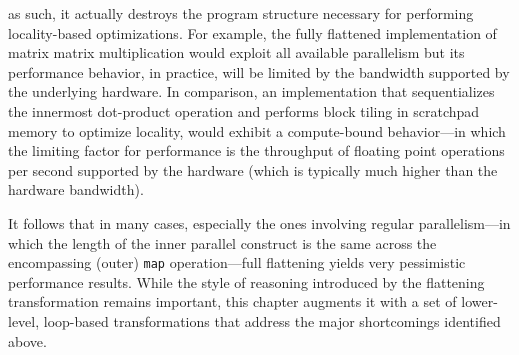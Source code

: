 \documentclass[acmsmall,review]{acmart}\settopmatter{printfolios=true,printccs=false,printacmref=false}
\begin{document}
\begin{itemize}
\begin{itemize}
                as such, it actually destroys the program structure necessary
                for performing locality-based optimizations.
                For example, the fully flattened implementation of matrix
                matrix multiplication would exploit all available parallelism
                but its performance behavior, in practice, will be limited
                by the bandwidth supported by the underlying hardware.
                In comparison, an implementation that sequentializes the 
                innermost dot-product operation and performs block tiling 
                in scratchpad memory to optimize locality, would exhibit 
                a compute-bound behavior---in which the limiting factor 
                for performance is the throughput of floating point 
                operations per second supported by the hardware
                (which is typically much higher than the hardware bandwidth).
        \end{itemize}
\end{itemize}
It follows that in many cases, especially the ones involving regular 
parallelism---in which the length of the inner parallel construct is 
the same across the encompassing (outer) \lstinline{map} operation---full
flattening yields very pessimistic performance results.   While 
the style of reasoning introduced by the flattening transformation 
remains important, this chapter augments it with a set of lower-level,
loop-based transformations that address the major shortcomings
identified above.  
\end{document}
